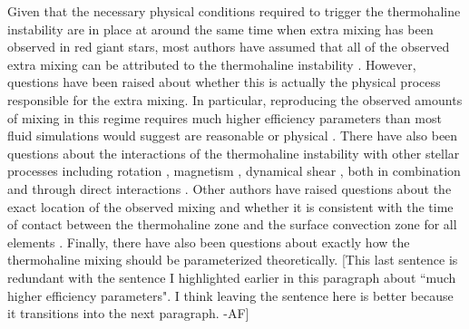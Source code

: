 Given that the necessary physical conditions required to trigger the thermohaline instability are in place at around the same time when extra mixing has been observed in red giant stars, 
most authors have assumed that all of the observed extra mixing can be attributed to the thermohaline instability \citep[e.g.][]{Kirby2016, Charbonnel2020, Magrini2021a}. %
However, questions have been raised about whether this is actually the physical process responsible for the extra mixing. In particular, reproducing the observed amounts of mixing in this regime requires much higher efficiency parameters than most fluid simulations would suggest are reasonable or physical %
\citep{Denissenkov2010thermohaline, denissenkov_merryfield_2011, traxler_etal_2011, brown_etal_2013}. There have also been questions about the interactions of the thermohaline instability with other stellar processes
including rotation \citep{Lagarde2011}, magnetism \citep{harrington}, 
dynamical shear \citep{CantielloLanger2010}, both in combination and through direct interactions \citep{Maeder2013, SenguptaGaraud2018,harrington}. 
Other authors have raised questions about the exact location of the observed mixing and whether it is consistent with the time of contact between the thermohaline zone and the surface convection zone for all elements \citep[see e.g.][]{Angelou2015, Henkel2017, TayarJoyce22}.
Finally, there have also been questions about exactly how the thermohaline mixing should be parameterized theoretically. 
[This last sentence is redundant with the sentence I highlighted earlier in this paragraph about ``much higher efficiency parameters". I think leaving the sentence here is better because it transitions into the next paragraph. -AF]

%

